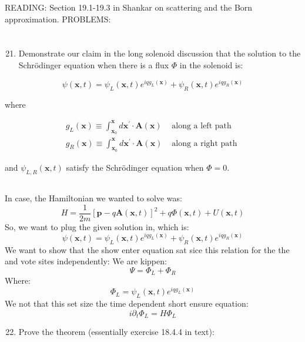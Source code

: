 \documentclass[12pt]{article}
\begin{document}
READING: Section 19.1-19.3 in Shankar on scattering and the Born approximation. PROBLEMS:
\section{}
\begin{enumerate}
  \setcounter{enumi}{20}
  \item Demonstrate our claim in the long solenoid discussion that the solution to the Schrödinger equation when there is a flux $\Phi$ in the solenoid is:
\end{enumerate}

$$
\psi(\mathbf{x}, t)=\psi_{L}(\mathbf{x}, t) e^{i q g_{L}(\mathbf{x})}+\psi_{R}(\mathbf{x}, t) e^{i q g_{R}(\mathbf{x})}
$$

where

$$
\begin{array}{ll}
g_{L}(\mathbf{x}) \equiv \int_{\mathbf{x}_{0}}^{\mathbf{x}} d \mathbf{x}^{\prime} \cdot \mathbf{A}(\mathbf{x}) & \text { along a left path } \\
g_{R}(\mathbf{x}) \equiv \int_{\mathbf{x}_{0}}^{\mathbf{x}} d \mathbf{x}^{\prime} \cdot \mathbf{A}(\mathbf{x}) & \text { along a right path }
\end{array}
$$

and $\psi_{L, R}(\mathbf{x}, t)$ satisfy the Schrödinger equation when $\Phi=0$.
\subsection{}
In case, the Hamiltonian we wanted to solve was:
\begin{equation}
  H=\frac{1}{2 m}[\mathbf{p}-q \mathbf{A}(\mathbf{x}, t)]^{2}+q \Phi(\mathbf{x}, t)+U(\mathbf{x}, t)
\end{equation}
So, we want to plug the given solution in, which is:
\begin{equation}
  \psi(\mathbf{x}, t)=\psi_{L}(\mathbf{x}, t) e^{i q g_{L}(\mathbf{x})}+\psi_{R}(\mathbf{x}, t) e^{i q g_{R}(\mathbf{x})}
\end{equation}
We want to show that the show enter equation sat sice this relation for the the and vote sites independently:
We are kippen:
\begin{equation}
  \Psi  = \Phi_L + \Phi_R 
\end{equation}
Where:
\begin{equation}
  \Phi_L = \psi_{L}(\mathbf{x}, t) e^{i q g_{L}(\mathbf{x})}
\end{equation}
We not that this set size the time dependent short ensure equation:
\begin{equation}
  i \partial_{t} \Phi_L = H \Phi_L
\end{equation}
\begin{enumerate}
  \setcounter{enumi}{21}
  \item Prove the theorem (essentially exercise 18.4.4 in text):
\end{enumerate}
\end{document}
